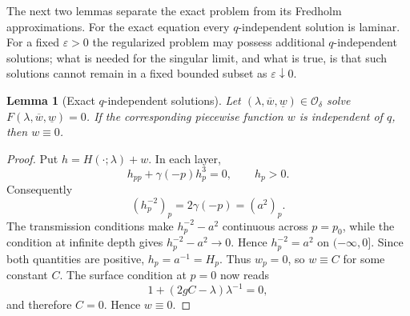 \documentclass[11pt,reqno]{amsart}
\numberwithin{equation}{section}
\newtheorem{lemma}[theorem]{Lemma}
\theoremstyle{definition}
\theoremstyle{remark}
\begin{document}
The next two lemmas separate the exact problem from its Fredholm
approximations.  For the exact equation every $q$-independent
solution is laminar.  For a fixed $\varepsilon>0$ the regularized
problem may possess additional $q$-independent solutions; what is
needed for the singular limit, and what is true, is that such
solutions cannot remain in a fixed bounded subset as
$\varepsilon\downarrow0$.

\begin{lemma}[Exact $q$-independent solutions]\label{lem:qind-exact}
Let $(\lambda,\overline w,\underline w)\in\mathcal O_\delta$ solve
$F(\lambda,\overline w,\underline w)=0$.  If the corresponding
piecewise function $w$ is independent of $q$, then $w\equiv0$.
\end{lemma}
\begin{proof}
Put $h=H(\cdot;\lambda)+w$.  In each layer,
\[
 h_{pp}+\gamma(-p)h_p^3=0,
 \qquad h_p>0.
\]
Consequently
\[
 (h_p^{-2})_p=2\gamma(-p)=(a^2)_p.
\]
The transmission conditions make $h_p^{-2}-a^2$ continuous across
$p=p_0$, while the condition at infinite depth gives
$h_p^{-2}-a^2\to0$.  Hence $h_p^{-2}=a^2$ on $(-\infty,0]$.
Since both quantities are positive, $h_p=a^{-1}=H_p$.  Thus $w_p=0$, so $w\equiv C$ for some constant $C$.  The
surface condition at $p=0$ now reads
\[
 1+(2gC-\lambda)\lambda^{-1}=0,
\]
and therefore $C=0$.  Hence $w\equiv0$.
\end{proof}
\end{document}
